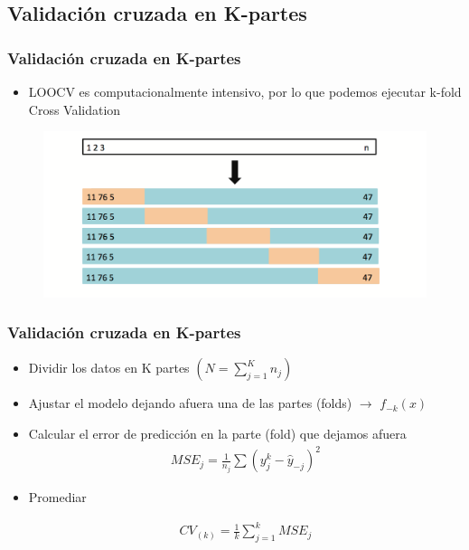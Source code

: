\documentclass[
  shownotes,
  xcolor={svgnames},
  hyperref={colorlinks,citecolor=DarkBlue,linkcolor=DarkRed,urlcolor=DarkBlue}
  , aspectratio=169]{beamer}
\begin{document}
\subsection{Validación cruzada en K-partes}
\begin{frame}[fragile]
\frametitle{Validación cruzada en K-partes}
\begin{itemize}
\item LOOCV es computacionalmente intensivo, por lo que podemos ejecutar k-fold Cross Validation 
\end{itemize}


 \begin{figure}[H] \centering
            \captionsetup{justification=centering}
              \includegraphics[scale=0.5]{figures/fig55.png}
       \end{figure}



\end{frame}
\begin{frame}[fragile]
\frametitle{Validación cruzada en K-partes}

\begin{itemize}
  \item Dividir los datos en K partes $(N=\sum_{j=1}^K n_j)$
  \medskip
  \item Ajustar el modelo dejando afuera una de las partes (folds)  $\rightarrow$ $f_{-k}(x)$
  \medskip
  \item Calcular el error de predicción en la parte (fold) que dejamos afuera 
  \begin{align}
  MSE_j=\frac{1}{n_j}\sum (y_j^k-\hat y_{-j})^2
  \end{align}
  \medskip
\item Promediar

\begin{align}
CV_{(k)}= \frac{1}{k}\sum_{j=1}^k MSE_j
\end{align}
\end{itemize}

\end{frame}
\end{document}
